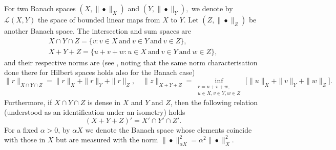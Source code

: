 \documentclass[11pt, reqno, a4paper, twoside]{article}
\newcommand{\cL}{\mathcal{L}}
\numberwithin{equation}{section}
\numberwithin{remark}{section}
\numberwithin{figure}{section}
\numberwithin{table}{section}
\begin{document}
For two Banach spaces $(X,\|\bullet\|_X)$ and $(Y,\|\bullet\|_Y),$ we denote by $\cL(X,Y)$ the space of bounded linear maps from $X$ to $Y$. Let $(Z,\|\bullet\|_Z)$ be another Banach space. The intersection and sum spaces are 
\begin{gather*} X \cap Y \cap Z = \{ v : v\in X \ \text{and} \ v\in Y \ \text{and}\ v\in Z\}, \\ X+ Y + Z = \{u+v+w: u\in X \ \text{and}\ v\in Y\ \text{and} \ w \in Z\},\end{gather*}
and their respective norms are (see \cite{baerland2020observation}, noting that the same norm characterisation done there for Hilbert spaces holds also for the Banach case)
\[ \| r\|_{X\cap Y \cap Z} = \|r\|_X + \|r\|_Y + \|r\|_Z, \quad \| z\|_{X + Y + Z} = \inf_{\substack{r = u+v+w, \\ u \in X, v\in Y, w\in Z}}\,\bigl[\|u\|_X + \|v\|_Y+ \|w\|_Z\bigr].\]
Furthermore, if $X \cap Y \cap Z$ is dense in $X$ and $Y$ and $Z$, then the following relation (understood as an identification under an isometry) holds 
\begin{equation}\label{eq:duality} (X+Y+Z)' = X'\cap Y' \cap Z'.\end{equation}
For a fixed $\alpha>0$, by $\alpha X$ we denote the Banach space whose elements coincide with those in $X$ but are measured with the norm 
\(\| \bullet \|^2_{\alpha X}= \alpha^2\|\bullet \|^2_X. \)
\end{document}

